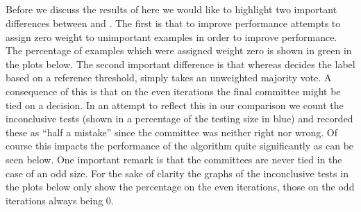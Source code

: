  \subsection{\NHB}
 \label{subsec:NHPracPerf}
Before we discuss the results of \NHB here we would like to highlight two important differences between \NHB and \adaB. The first is that to improve performance \NHB attempts to assign zero weight to unimportant examples in order to improve performance. The percentage of examples which were assigned weight zero is shown in green in the plots below. The second important difference is that whereas \adaB decides the label based on a reference threshold, \NHB simply takes an unweighted majority vote. A consequence of this is that on the even iterations the final committee might be tied on a decision. In an attempt to reflect this in our comparison we count the inconclusive tests (shown in a percentage of the testing size in blue) and recorded these as ``half a mistake'' since the committee was neither right nor wrong. Of course this impacts the performance of the algorithm quite significantly as can be seen below.  One important remark is that the committees are never tied in the case of an odd size. For the sake of clarity the graphs of the inconclusive tests in the plots below only show the percentage on the even iterations, those on the odd iterations always being 0.


